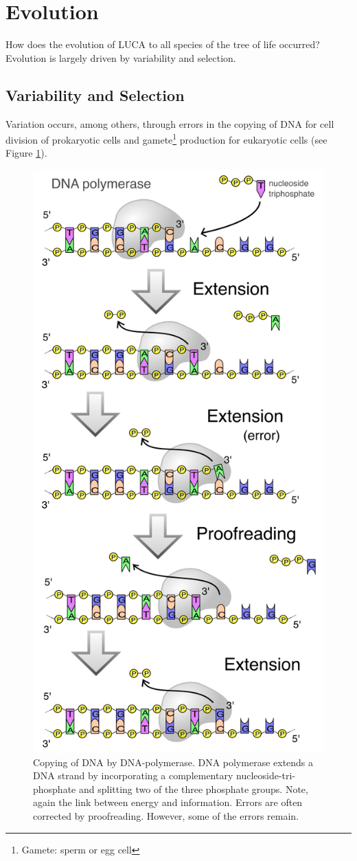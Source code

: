 \documentclass[
  11pt,
]{book}
\begin{document}
\hypertarget{evolution}{%
\section{Evolution}\label{evolution}}

How does the evolution of LUCA to all species of the tree of life occurred?
Evolution is largely driven by variability and selection.

\hypertarget{variability-and-selection}{%
\subsection{Variability and Selection}\label{variability-and-selection}}

Variation occurs, among others, through errors in the copying of DNA for cell division of prokaryotic cells and gamete\footnote{Gamete: sperm or egg cell} production for eukaryotic cells (see Figure \ref{fig:dnaPolymerase}).

\begin{figure}

{\centering \includegraphics[width=0.45\linewidth]{./figs/DNA_polymerase} 

}

\caption{Copying of DNA by DNA-polymerase. DNA polymerase extends a DNA strand by incorporating a complementary nucleoside-tri-phosphate and splitting two of the three phosphate groups. Note, again the link between energy and information. Errors are often corrected by proofreading. However, some of the errors remain.}\label{fig:dnaPolymerase}
\end{figure}
\end{document}
